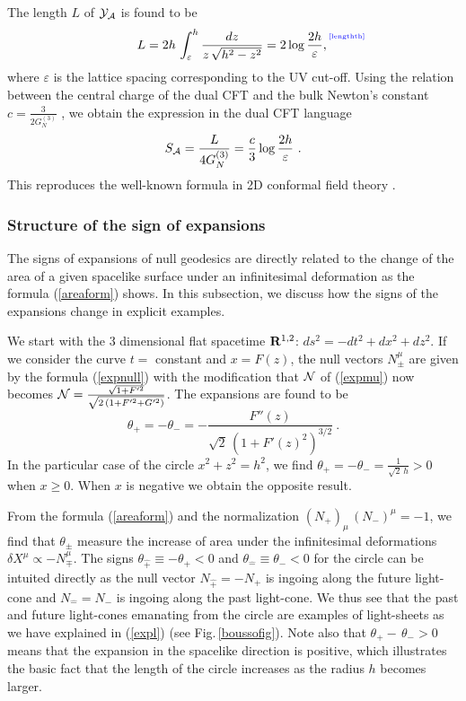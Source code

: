 \documentclass[12pt]{article}
\newcommand{\be}{\begin{equation}}
\newcommand{\ee}{\end{equation}}
\def\fig#1{Fig.\,\ref{#1}}
\def\req#1{(\ref{#1})}
\def\({\left (}
\def\){\right )}
\def\veps{\varepsilon}
\def\s{\sigma}
\def\CA{{\cal A}}
\def\CY{{\cal Y}}
\def\R{{\bf R}}
\def\f#1#2{{\frac{#1}{#2}}}
\def\f#1#2{{\frac{#1}{#2}}}
\def\Label#1{\label{#1}%
{ \color{blue}{\smash{\hbox to0pt{\raise2ex\hbox{\tiny[#1]}\hss}}}}}
\def\Lms{\CY}
\def\rA{\CA}
\def\cof{{\veps}}
\def\s{\sqrt}
\def\f {\frac}
\begin{document}
The length $L$ of $\Lms_{\rA}$ is found to be
%
\be L=2h\,  \int^h_{\cof}
\f{dz}{z\,\s{h^2-z^2}}=2\log\f{2h}{\cof}, \Label{lengthth} \ee
%
where $\cof$ is the lattice spacing corresponding to the UV cut-off. Using the relation
between the central charge of the dual CFT and the bulk Newton's constant
$c=\f{3}{2G^{(3)}_N}$ \cite{Brown:1986nw}, we obtain the expression
in the dual CFT language
%
\be S_{\rA}=\f{L}{4G^{(3)}_N}=\f{c}{3}\log
\f{2h}{\cof} \ .
\ee
%
This reproduces the well-known formula in 2D
conformal field theory \cite{Holzhey:1994we, Calabrese:2004eu}.


\subsubsection{Structure of the sign of expansions}
\label{stru}

The signs of expansions of null geodesics are directly related to
the change of the area of a given spacelike surface under an
infinitesimal deformation as the formula \req{areaform} shows.
In this subsection, we discuss how the signs of the
expansions change in explicit examples.

We start with the 3
dimensional flat spacetime $\R^{1,2}$: $ds^2=-dt^2+dx^2+dz^2$. If we
consider the curve $t=$ constant and $x=F(z)$, the null vectors
$N_\pm^\mu$ are given by the formula \req{expnull} with the
modification that ${\cal N}$ of \req{expmu} now becomes ${\cal N} =
\f{\s{1+F'^2}}{\s{2 \, (1+F'^2+G'^2)}}$. The expansions are found to
be
%
\be \theta_+=-\theta_-=-\f{F''(z)}{\s{2}\, \(1+F'(z)^2\)^{3/2}} \ .
\ee
%
In the particular case of the circle $x^2+z^2=h^2$, we find
$\theta_+=-\theta_-=\f{1}{\s{2} \, h}>0$ when
 $x\geq 0$. When $x$ is negative we obtain the opposite result.

{}From the formula \req{areaform} and the normalization $(N_+)_\mu
\, (N_-)^\mu=-1$, we find that $\theta_\pm$ measure the increase of
area under the infinitesimal deformations $\delta X^\mu \propto
-N^\mu_\mp$. The signs $\theta_{\hat{+}}\equiv -\theta_+<0$ and
$\theta_{\hat{-}}\equiv \theta_-<0$ for the circle can be intuited
directly as the null vector $N_{\hat{+}}=-N_+$ is ingoing along the
future light-cone and $N_{\hat{-}}=N_-$ is ingoing along the past
light-cone. We thus see that the past and future light-cones
emanating from the circle are examples of light-sheets as we have
explained in \req{expl} (see \fig{boussofig}). Note also that
$\theta_+ - \,\theta_->0$ means that the expansion in the spacelike
direction is positive, which illustrates  the basic fact that the
length of the circle increases as the radius $h$ becomes larger.
\end{document}
